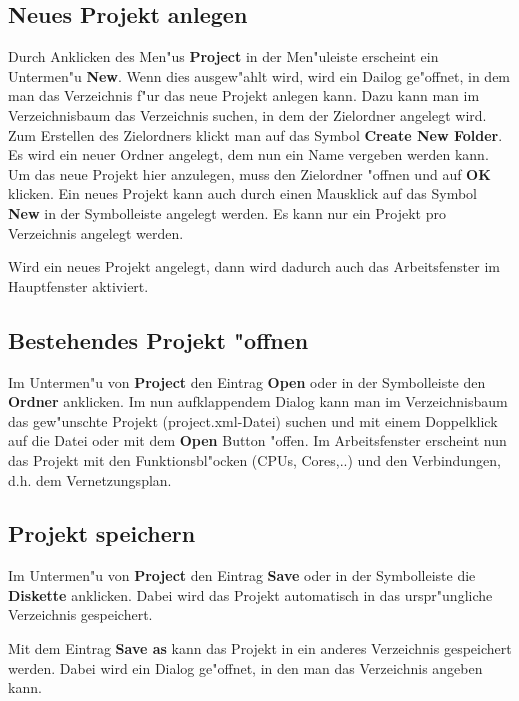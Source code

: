 \documentclass[a4paper,titlepage,12pt,ngerman]{scrbook}
\begin{document}
\subsection{Neues Projekt anlegen}
Durch Anklicken des Men"us {\bf Project} in der Men"uleiste erscheint ein Untermen"u {\bf New}. Wenn dies ausgew"ahlt wird, wird ein Dailog ge"offnet, in dem man das Verzeichnis f"ur das neue Projekt anlegen kann. Dazu kann man im Verzeichnisbaum das Verzeichnis suchen, in dem der Zielordner angelegt wird. Zum Erstellen des Zielordners klickt man auf das Symbol {\bf Create New Folder}. Es wird ein neuer Ordner angelegt, dem nun ein Name vergeben werden kann. Um das neue Projekt hier anzulegen, muss den Zielordner "offnen und auf {\bf OK} klicken.\newline
Ein neues Projekt kann auch durch einen Mausklick auf das Symbol {\bf New} in der Symbolleiste angelegt werden.\newline
Es kann nur ein Projekt pro Verzeichnis angelegt werden.\par
Wird ein neues Projekt angelegt, dann wird dadurch auch das Arbeitsfenster im Hauptfenster aktiviert.


\subsection{Bestehendes Projekt "offnen}
Im Untermen"u von {\bf Project} den Eintrag {\bf Open} oder in der Symbolleiste den {\bf Ordner} anklicken. Im nun aufklappendem Dialog kann man im Verzeichnisbaum das gew"unschte Projekt (project.xml-Datei) suchen und mit einem Doppelklick auf die Datei oder mit dem {\bf Open} Button "offen.
Im Arbeitsfenster erscheint nun das Projekt mit den Funktionsbl"ocken (CPUs, Cores,..) und den Verbindungen, d.h. dem Vernetzungsplan.\par


\subsection{Projekt speichern}
Im Untermen"u von {\bf Project} den Eintrag {\bf Save} oder in der Symbolleiste die {\bf Diskette} anklicken. Dabei wird das Projekt automatisch in das urspr"ungliche Verzeichnis gespeichert.\par
Mit dem Eintrag {\bf Save as} kann das Projekt in ein anderes Verzeichnis gespeichert werden. Dabei wird ein Dialog ge"offnet, in den man das Verzeichnis angeben kann.\par
\end{document}
